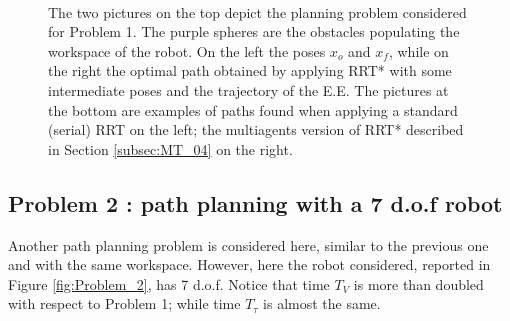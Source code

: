 \begin{figure}
	\centering
{} \quad
{} \\
 \quad
{}
\caption{The two pictures on the top depict the planning problem considered for Problem 1. The purple spheres are the obstacles populating the workspace of the robot. On the left the poses $x_o$ and $x_f$, while on the right the optimal path obtained by applying RRT* with some intermediate poses and the trajectory of the E.E. 
The pictures at the bottom are examples of paths found when applying a standard (serial) RRT on the left; the multiagents version of RRT* described in Section \ref{subsec:MT_04} on the right.}
	\label{fig:Problem_1}
\end{figure}

\subsection{Problem 2 : path planning with a 7 d.o.f robot }
\label{sec:probl_2}

Another path planning problem is considered here, similar to the previous one and with the same workspace. 
However, here the robot considered, reported in Figure \ref{fig:Problem_2}, has 7 d.o.f. 
Notice that time $T_V$ is more than doubled with respect to Problem 1; while time $T_{\tau}$ is almost the same.    

